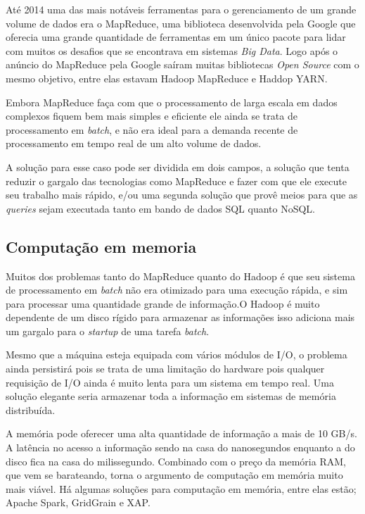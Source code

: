 Até 2014 uma das mais notáveis ferramentas para o gerenciamento de um grande volume de dados era o MapReduce, uma biblioteca desenvolvida pela Google que oferecia uma grande quantidade de ferramentas em um único pacote para lidar com muitos os desafios que se encontrava em sistemas \textit{Big Data}. Logo após o anúncio do MapReduce pela Google saíram muitas bibliotecas \textit{Open Source} com o mesmo objetivo, entre elas estavam  Hadoop MapReduce e Haddop YARN.

Embora MapReduce faça com que o processamento de larga escala em dados complexos fiquem bem mais simples e eficiente ele ainda se trata de processamento em \textit{batch}, e não era ideal para a demanda recente de processamento em tempo real de um alto volume de dados.

A solução para esse caso pode ser dividida em dois campos, a solução que tenta reduzir o gargalo das tecnologias como MapReduce e fazer com que ele execute seu trabalho mais rápido, e/ou uma segunda solução que provê meios para que as \textit{queries} sejam executada tanto em bando de dados SQL quanto NoSQL.~\cite{realtime}

\subsection{Computação em memoria}

Muitos dos problemas tanto do MapReduce quanto do Hadoop é que seu sistema de processamento em \textit{batch} não era otimizado para uma execução rápida, e sim para processar uma quantidade grande de informação.O Hadoop é muito dependente de um disco rígido para armazenar as informações isso adiciona mais um gargalo para o \textit{startup} de uma tarefa \textit{batch}.

Mesmo que a máquina esteja equipada com vários módulos de I/O, o problema ainda persistirá pois se trata de uma limitação do hardware pois qualquer requisição de I/O ainda é muito lenta para um sistema em tempo real. Uma solução elegante seria armazenar toda a informação em sistemas de memória distribuída.

A memória pode oferecer uma alta quantidade de informação a mais de 10 GB/s. A latência no acesso a informação sendo na casa do nanosegundos enquanto a do disco fica na casa do milissegundo. Combinado com o preço da memória RAM, que vem se barateando, torna o argumento de computação em memória muito mais viável. Há algumas soluções para computação em memória, entre elas estão; Apache Spark, GridGrain e XAP.

